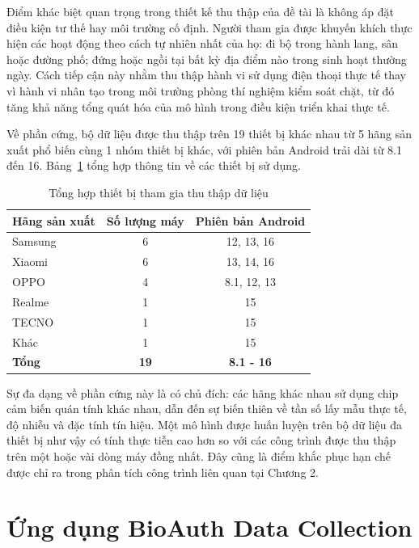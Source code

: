 \documentclass[../DoAn.tex]{subfiles}
\begin{document}
Điểm khác biệt quan trọng trong thiết kế thu thập của đề tài là không áp đặt điều kiện tư thế hay môi trường cố định. Người tham gia được khuyến khích thực hiện các hoạt động theo cách tự nhiên nhất của họ: đi bộ trong hành lang, sân hoặc đường phố; đứng hoặc ngồi tại bất kỳ địa điểm nào trong sinh hoạt thường ngày. Cách tiếp cận này nhằm thu thập hành vi sử dụng điện thoại thực tế thay vì hành vi nhân tạo trong môi trường phòng thí nghiệm kiểm soát chặt, từ đó tăng khả năng tổng quát hóa của mô hình trong điều kiện triển khai thực tế.

Về phần cứng, bộ dữ liệu được thu thập trên 19 thiết bị khác nhau từ 5 hãng sản xuất phổ biến cùng 1 nhóm thiết bị khác, với phiên bản Android trải dài từ 8.1 đến 16. Bảng~\ref{tab:devices} tổng hợp thông tin về các thiết bị sử dụng.

\begin{table}[H]
    \centering
    \caption{Tổng hợp thiết bị tham gia thu thập dữ liệu}
    \label{tab:devices}
    \begin{tabular}{|l|c|c|}
    \hline
    \textbf{Hãng sản xuất} & \textbf{Số lượng máy} 
        & \textbf{Phiên bản Android} \\
    \hline
    Samsung  & 6 & 12, 13, 16 \\
    \hline
    Xiaomi   & 6 & 13, 14, 16 \\
    \hline
    OPPO     & 4 & 8.1, 12, 13 \\
    \hline
    Realme   & 1 & 15 \\
    \hline
    TECNO    & 1 & 15 \\
    \hline
    Khác     & 1 & 15 \\
    \hline
    \textbf{Tổng} & \textbf{19} & \textbf{8.1 - 16} \\
    \hline
    \end{tabular}
\end{table}

Sự đa dạng về phần cứng này là có chủ đích: các hãng khác nhau sử dụng chip cảm biến quán tính khác nhau, dẫn đến sự biến thiên về tần số lấy mẫu thực tế, độ nhiễu và đặc tính tín hiệu. Một mô hình được huấn luyện trên bộ dữ liệu đa thiết bị như vậy có tính thực tiễn cao hơn so với các công trình được thu thập trên một hoặc vài dòng máy đồng nhất. Đây cũng là điểm khắc phục hạn chế được chỉ ra trong phân tích công trình liên quan tại Chương 2.

\section{Ứng dụng BioAuth Data Collection}
\label{sec:appthuthu}
\end{document}
